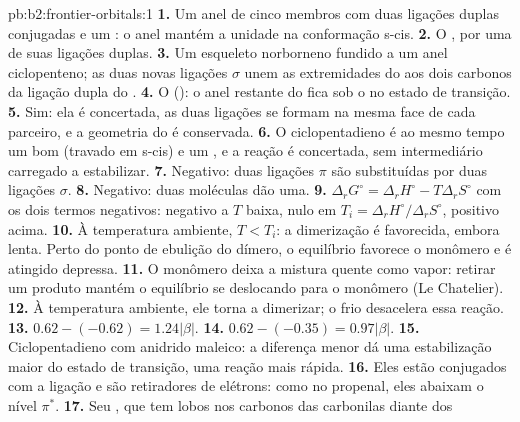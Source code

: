 \begin{solution}{pb:b2:frontier-orbitals:1}
\textbf{1.} Um anel de cinco membros com duas ligações duplas conjugadas e um
: o anel mantém a unidade  na conformação s-cis.
\textbf{2.} O , por uma de suas ligações duplas.
\textbf{3.} Um esqueleto norborneno fundido a um anel ciclopenteno; as duas
novas ligações $\sigma$ unem as extremidades do  aos dois carbonos da
ligação dupla do .
\textbf{4.} O  (): o anel restante do  fica sob o
 no estado de transição.
\textbf{5.} Sim: ela é concertada, as duas ligações se formam na mesma face de
cada parceiro, e a geometria do  é conservada.
\textbf{6.} O ciclopentadieno é ao mesmo tempo um bom  (travado em s-cis) e
um , e a reação é concertada, sem intermediário carregado a
estabilizar.
\textbf{7.} Negativo: duas ligações $\pi$ são substituídas por duas ligações $\sigma$.
\textbf{8.} Negativo: duas moléculas dão uma.
\textbf{9.} $\Delta_r G^\circ = \Delta_r H^\circ - T\Delta_r S^\circ$ com os dois termos negativos: negativo a
$T$ baixa, nulo em $T_i = \Delta_r H^\circ/\Delta_r S^\circ$, positivo acima.
\textbf{10.} À temperatura ambiente, $T < T_i$: a dimerização é favorecida, embora
lenta. Perto do ponto de ebulição do dímero, o equilíbrio favorece o monômero
e é atingido depressa.
\textbf{11.} O monômero deixa a mistura quente como vapor: retirar um produto
mantém o equilíbrio se deslocando para o monômero (Le Chatelier).
\textbf{12.} À temperatura ambiente, ele torna a dimerizar; o frio desacelera
essa reação.
\textbf{13.} $0.62 - (-0.62) = 1.24|\beta|$.
\textbf{14.} $0.62 - (-0.35) = 0.97|\beta|$.
\textbf{15.} Ciclopentadieno com anidrido maleico: a diferença menor dá uma
estabilização maior do estado de transição, uma reação mais rápida.
\textbf{16.} Eles estão conjugados com a ligação  e são retiradores de
elétrons: como no propenal, eles abaixam o nível $\pi^*$.
\textbf{17.} Seu , que tem lobos nos carbonos das carbonilas diante dos

\end{solution}
